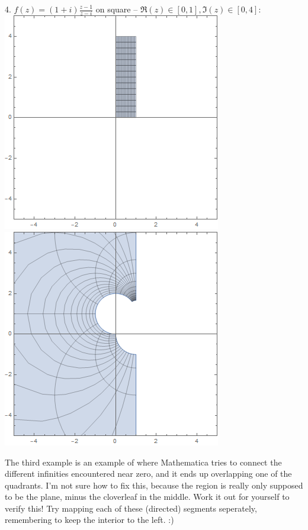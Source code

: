 \begin{center}
  4. $f(z) = (1+i)\frac{z-1}{z-i}$ on square -- $\Re(z) \in [0,1], \Im(z) \in [0,4]$: \\
  \includegraphics[scale=0.3]{images/mobius4dom.png}
  \includegraphics[scale=0.3]{images/mobius4ran.png}
\end{center}
The third example is an example of where Mathematica tries to connect the different infinities encountered near zero, and it ends up overlapping one of the quadrants. I'm not sure how to fix this, because the region is really only supposed to be the plane, minus the cloverleaf in the middle. Work it out for yourself to verify this! Try mapping each of these (directed) segments seperately, remembering to keep the interior to the left. :)